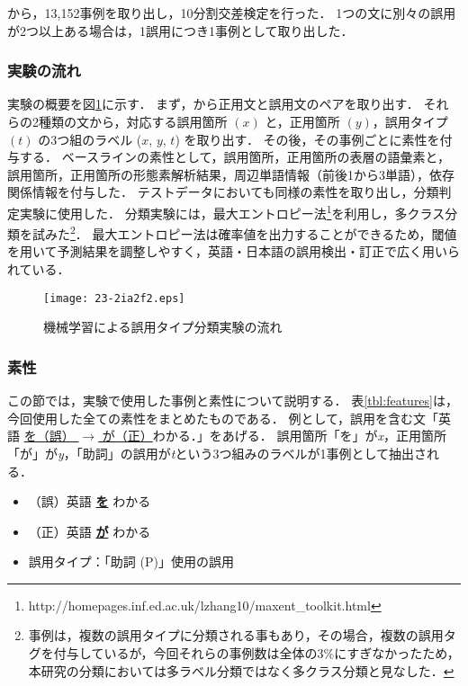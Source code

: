 \documentclass[japanese]{jnlp_1.4}
\newcommand{\ngc}{}
\begin{document}
\ngc\hbox{}から，13,152事例を取り出し，10分割交差検定を行った．
1つの文に別々の誤用が2つ以上ある場合は，1誤用につき1事例として取り出した．


\subsubsection{実験の流れ}

実験の概要を図\ref{fig:jikken-outline}に示す．
まず，\ngc\hbox{}から正用文と誤用文のペアを取り出す．
それらの2種類の文から，対応する誤用箇所 $(x)$ と，正用箇所 $(y)$，誤用タイプ $(t)$ の3つ組のラベル ($x$, $y$, $t$) を取り出す．
その後，その事例ごとに素性を付与する．
ベースラインの素性として，誤用箇所，正用箇所の表層の語彙素と，誤用箇所，正用箇所の形態素解析結果，周辺単語情報（前後1から3単語），依存関係情報を付与した．
テストデータにおいても同様の素性を取り出し，分類判定実験に使用した．
分類実験には，最大エントロピー法\footnote{http://homepages.inf.ed.ac.uk/lzhang10/maxent\_toolkit.html}を利用し，多クラス分類を試みた\footnote{事例は，複数の誤用タイプに分類される事もあり，その場合，複数の誤用タグを付与しているが，今回それらの事例数は全体の3\%にすぎなかったため，本研究の分類においては多ラベル分類ではなく多クラス分類と見なした．}．
最大エントロピー法は確率値を出力することができるため，閾値を用いて予測結果を調整しやすく，英語・日本語の誤用検出・訂正で広く用いられている\cite{suzuki/06b,swanson}．

\begin{figure}[t]
\begin{center}
\texttt{[image: 23-2ia2f2.eps]}
\end{center}
\caption{機械学習による誤用タイプ分類実験の流れ}
\label{fig:jikken-outline}
\end{figure}



\subsubsection{素性}

この節では，実験で使用した事例と素性について説明する．
表\ref{tbl:features}は，今回使用した全ての素性をまとめたものである．
例として，誤用を含む文「英語 \underline{を（誤）}\underline{ $\rightarrow$ が（正）}わかる．」をあげる．
誤用箇所「を」が{\it x}，正用箇所「が」が{\it y}，「助詞」の誤用が{\it t}という3つ組みのラベルが1事例として抽出される．

\begin{itemize}
\item （誤）英語  \underline{{\bf を}} わかる
\item （正）英語  \underline{{\bf が}} わかる
\item  誤用タイプ：「助詞 (P)」使用の誤用
\end{itemize}
\end{document}
